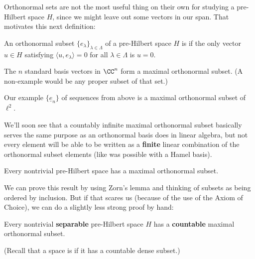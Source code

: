 Orthonormal sets are not the most useful thing on their own for studying a pre-Hilbert space $H$, since we might leave out some vectors in our span. That motivates this next definition:

\begin{definition}
An orthonormal subset $\{e_{\lambda}\}_{\lambda \in \Lambda}$ of a pre-Hilbert space $H$ is  if the only vector $u \in H$ satisfying $\langle u, e_\lambda \rangle =  0$ for all $\lambda \in \Lambda$ is $u = 0$.
\end{definition}

\begin{example}
The $n$ standard basis vectors in $\CC^n$ form a maximal orthonormal subset. (A non-example would be any proper subset of that set.)
\end{example}

\begin{example}
Our example $\{\underline{e}_n\}$ of sequences from above is a maximal orthonormal subset of $\ell^2$.
\end{example}

We'll soon see that a countably infinite maximal orthonormal subset basically serves the same purpose as an orthonormal basis does in linear algebra, but not every element will be able to be written as a \textbf{finite} linear combination of the orthonormal subset elements (like was possible with a Hamel basis). 

\begin{theorem}
Every nontrivial pre-Hilbert space has a maximal orthonormal subset.
\end{theorem}

We can prove this result by using Zorn's lemma and thinking of subsets as being ordered by inclusion. But if that scares us (because of the use of the Axiom of Choice), we can do a slightly less strong proof by hand:

\begin{theorem}
Every nontrivial \textbf{separable} pre-Hilbert space $H$ has a \textbf{countable} maximal orthonormal subset.
\end{theorem}

(Recall that a space is  if it has a countable dense subset.)


